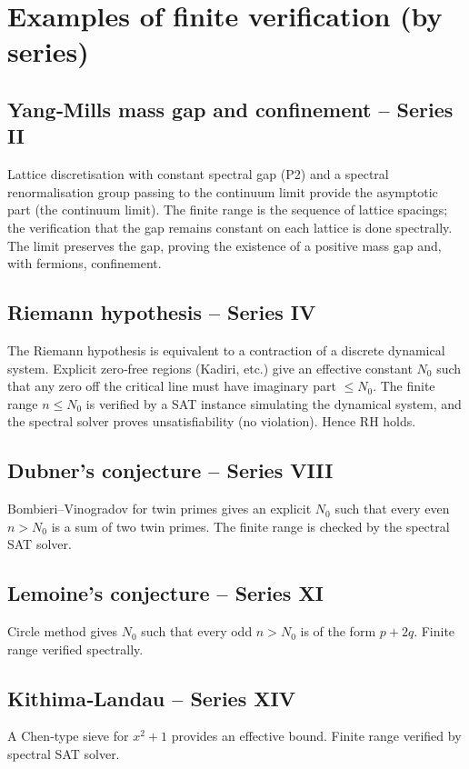 \documentclass[11pt,a4paper]{article}
\begin{document}
\section{Examples of finite verification (by series)}

\subsection{Yang‑Mills mass gap and confinement – Series II}
Lattice discretisation with constant spectral gap (P2) and a spectral renormalisation group passing to the continuum limit provide the asymptotic part (the continuum limit). The finite range is the sequence of lattice spacings; the verification that the gap remains constant on each lattice is done spectrally. The limit preserves the gap, proving the existence of a positive mass gap and, with fermions, confinement.

\subsection{Riemann hypothesis – Series IV}
The Riemann hypothesis is equivalent to a contraction of a discrete dynamical system. Explicit zero‑free regions (Kadiri, etc.) give an effective constant \(N_0\) such that any zero off the critical line must have imaginary part \(\le N_0\). The finite range \(n \le N_0\) is verified by a SAT instance simulating the dynamical system, and the spectral solver proves unsatisfiability (no violation). Hence RH holds.

\subsection{Dubner's conjecture – Series VIII}
Bombieri–Vinogradov for twin primes gives an explicit \(N_0\) such that every even \(n > N_0\) is a sum of two twin primes. The finite range is checked by the spectral SAT solver.

\subsection{Lemoine's conjecture – Series XI}
Circle method gives \(N_0\) such that every odd \(n > N_0\) is of the form \(p+2q\). Finite range verified spectrally.

\subsection{Kithima‑Landau – Series XIV}
A Chen‑type sieve for \(x^2+1\) provides an effective bound. Finite range verified by spectral SAT solver.
\end{document}
